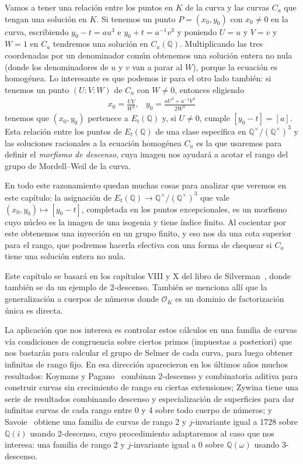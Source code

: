 \documentclass[a4paper]{book}
\theoremstyle{definition}
\theoremstyle{plain}
\newcommand{\QQ}{\mathbb{Q}}
\newcommand{\OO}{\mathcal{O}}
\newcommand{\QmodT}{\QQ^\times/{(\QQ^\times)}^3}
\begin{document}
Vamos a tener una relación entre los puntos en $K$ de la curva y las curvas $C_a$ que tengan una solución en $K$. Si tenemos un punto $P=(x_0,y_0)$ con $x_0\neq0$ en la curva, escribiendo $y_0-t = au^3$ e $y_0+t=a^{-1} v^3$ y poniendo $U=u$ y $V=v$ y $W=1$ en $C_a$ tendremos una solución en $C_a(\QQ)$. Multiplicando las tres coordenadas por un denominador común obtenemos una solución entera no nula (donde los denominadores de $u$ y $v$ van a parar al $W$), porque la ecuación es homogénea. Lo interesante es que podemos ir para el otro lado también: si tenemos un punto $(U:V:W)$ de $C_a$ con $W\neq0$, entonces eligiendo
\[
\begin{array}{cc}
x_0=\frac{UV}{W^2},
&
y_0=\frac{aU^3+a^{-1}V^3}{2W^3}
\end{array}
\]
tenemos que $(x_0,y_0)$ pertenece a $E_t(\QQ)$ y, si $U\neq0$, cumple $[y_0-t]=[a]$. Esta relación entre los puntos de $E_t(\QQ)$ de una clase específica en $\QmodT$ y las soluciones racionales a la ecuación homogénea $C_a$ es la que usaremos para definir el \emph{morfismo de descenso}, cuya imagen nos ayudará a acotar el rango del grupo de Mordell--Weil de la curva.

En todo este razonamiento quedan muchas cosas para analizar que veremos en este capítulo: la asignación de $E_t(\QQ)\to\QmodT$ que vale $(x_0,y_0)\mapsto[y_0-t]$, completada en los puntos excepcionales, es un morfismo cuyo núcleo es la imagen de una isogenia y tiene índice finito. Al cocientar por este obtenemos una inyección en un grupo finito, y eso nos da una cota superior para el rango, que podremos hacerla efectiva con una forma de chequear si $C_a$ tiene una solución entera no nula.

Este capítulo se basará en los capítulos VIII y X del libro de Silverman~\cite{SilvermanAEC}, donde también se da un ejemplo de 2-descenso. También se menciona allí que la generalización a cuerpos de números donde $\OO_K$ es un dominio de factorización única es directa.

La aplicación que nos interesa es controlar estos cálculos en una familia de curvas vía condiciones de congruencia sobre ciertos primos (impuestas a posteriori) que nos bastarán para calcular el grupo de Selmer de cada curva, para luego obtener infinitas de rango fijo. En esa dirección aparecieron en los últimos años muchos resultados: Koymans y Pagano~\cite{KoymansPagano2025} combinan 2-descenso y combinatoria aditiva para construir curvas sin crecimiento de rango en ciertas extensiones; Zywina tiene una serie de resultados combinando descenso y especialización de superficies para dar infinitas curvas de cada rango entre 0 y 4 sobre todo cuerpo de números; y Savoie~\cite{Savoie2025QiRank2} obtiene una familia de curvas de rango 2 y $j$-invariante igual a 1728 sobre $\QQ(i)$ usando 2-descenso, cuyo procedimiento adaptaremos al caso que nos interesa: una familia de rango 2 y $j$-invariante igual a 0 sobre $\QQ(\omega)$ usando 3-descenso.
\end{document}
